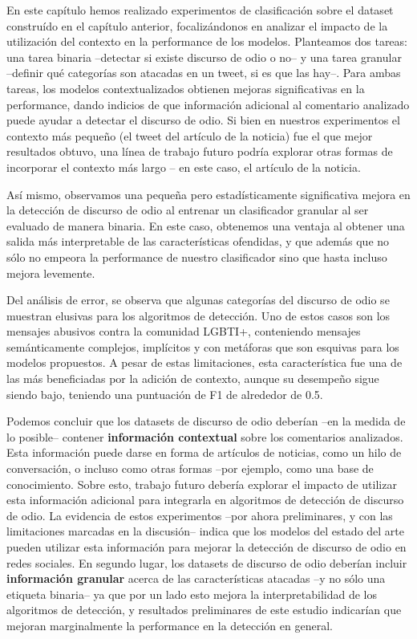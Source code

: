 En este capítulo hemos realizado experimentos de clasificación sobre el dataset construído en el capítulo anterior, focalizándonos en analizar el impacto de la utilización del contexto en la performance de los modelos. Planteamos dos tareas: una tarea binaria --detectar si existe discurso de odio o no-- y una tarea granular --definir qué categorías son atacadas en un tweet, si es que las hay--. Para ambas tareas, los modelos contextualizados obtienen mejoras significativas en la performance, dando indicios de que información adicional al comentario analizado puede ayudar a detectar el discurso de odio. Si bien en nuestros experimentos el contexto más pequeño (el tweet del artículo de la noticia) fue el que mejor resultados obtuvo, una línea de trabajo futuro podría explorar otras formas de incorporar el contexto más largo -- en este caso, el artículo de la noticia.

Así mismo, observamos una pequeña pero estadísticamente significativa mejora en la detección de discurso de odio al entrenar un clasificador granular al ser evaluado de manera binaria. En este caso, obtenemos una ventaja al obtener una salida más interpretable de las características ofendidas, y que además que no sólo no empeora la performance de nuestro clasificador sino que hasta incluso mejora levemente.

Del análisis de error, se observa que algunas categorías del discurso de odio se muestran elusivas para los algoritmos de detección. Uno de estos casos son los mensajes abusivos contra la comunidad LGBTI+, conteniendo mensajes semánticamente complejos, implícitos y con metáforas que son esquivas para los modelos propuestos. A pesar de estas limitaciones, esta característica fue una de las más beneficiadas por la adición de contexto, aunque su desempeño sigue siendo bajo, teniendo una puntuación de F1 de alrededor de 0.5.

Podemos concluir que los datasets de discurso de odio deberían --en la medida de lo posible-- contener \textbf{información contextual} sobre los comentarios analizados. Esta información puede darse en forma de artículos de noticias, como un hilo de conversación, o incluso como otras formas --por ejemplo, como una base de conocimiento. Sobre esto, trabajo futuro debería explorar el impacto de utilizar esta información adicional para integrarla en algoritmos de detección de discurso de odio. La evidencia de estos experimentos --por ahora preliminares, y con las limitaciones marcadas en la discusión-- indica que los modelos del estado del arte pueden utilizar esta información para mejorar la detección de discurso de odio en redes sociales. En segundo lugar, los datasets de discurso de odio deberían incluir \textbf{información granular} acerca de las características atacadas --y no sólo una etiqueta binaria-- ya que por un lado esto mejora la interpretabilidad de los algoritmos de detección, y resultados preliminares de este estudio indicarían que mejoran marginalmente la performance en la detección en general.

